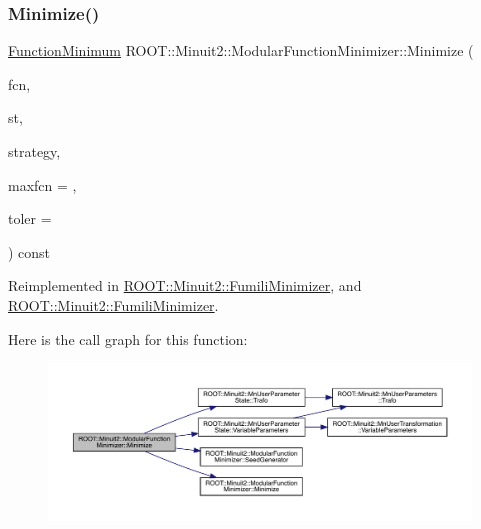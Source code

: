 \subsubsection{\texorpdfstring{Minimize()}{Minimize()}\hspace{0.1cm}{\footnotesize\ttfamily [20/22]}}
{\footnotesize\ttfamily \mbox{\hyperlink{classROOT_1_1Minuit2_1_1FunctionMinimum}{Function\+Minimum}} R\+O\+O\+T\+::\+Minuit2\+::\+Modular\+Function\+Minimizer\+::\+Minimize (\begin{DoxyParamCaption}\item[{const \mbox{\hyperlink{classROOT_1_1Minuit2_1_1FCNGradientBase}{F\+C\+N\+Gradient\+Base}} \&}]{fcn,  }\item[{const \mbox{\hyperlink{classROOT_1_1Minuit2_1_1MnUserParameterState}{Mn\+User\+Parameter\+State}} \&}]{st,  }\item[{const \mbox{\hyperlink{classROOT_1_1Minuit2_1_1MnStrategy}{Mn\+Strategy}} \&}]{strategy,  }\item[{unsigned int}]{maxfcn = {},  }\item[{double}]{toler = {} }\end{DoxyParamCaption}) const\hspace{0.3cm}{\ttfamily [virtual]}}



Reimplemented in \mbox{\hyperlink{classROOT_1_1Minuit2_1_1FumiliMinimizer_afe0f09e5e093e65ac8fadc13c459ad5c}{R\+O\+O\+T\+::\+Minuit2\+::\+Fumili\+Minimizer}}, and \mbox{\hyperlink{classROOT_1_1Minuit2_1_1FumiliMinimizer_a2bffd3a7c3090b841f8c23248b83b16e}{R\+O\+O\+T\+::\+Minuit2\+::\+Fumili\+Minimizer}}.

Here is the call graph for this function\+:\nopagebreak
\begin{figure}[H]
\begin{center}
\leavevmode
\includegraphics[width=350pt]{d3/dc8/classROOT_1_1Minuit2_1_1ModularFunctionMinimizer_a2e1e21161544b931511204cdedac914d_cgraph}
\end{center}
\end{figure}
\mbox{\label{classROOT_1_1Minuit2_1_1ModularFunctionMinimizer_ad4852ac93fa43f2328b9857acc602296}} 
